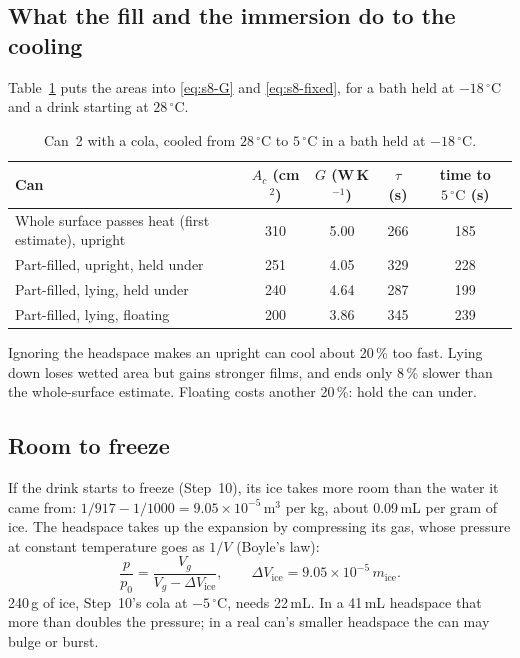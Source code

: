 \documentclass[11pt,a4paper]{article}
\newcommand{\dC}{\,{}^{\circ}\mathrm{C}}
\begin{document}
\subsection{What the fill and the immersion do to the cooling}
Table~\ref{tab:fill} puts the areas into \eqref{eq:s8-G} and \eqref{eq:s8-fixed}, for a bath held at
$-18\dC$ and a drink starting at $28\dC$.

\begin{table}[ht]
\centering\small
\caption{Can~2 with a cola, cooled from $28\dC$ to $5\dC$ in a bath held at $-18\dC$.}
\label{tab:fill}
\begin{tabular}{@{}lcccc@{}}
\toprule
Can & $A_c$ (cm$^2$) & $G$ (W\,K$^{-1}$) & $\tau$ (s) & time to $5\dC$ (s)\\
\midrule
Whole surface passes heat (first estimate), upright & 310 & 5.00 & 266 & 185\\
Part-filled, upright, held under & 251 & 4.05 & 329 & 228\\
Part-filled, lying, held under & 240 & 4.64 & 287 & 199\\
Part-filled, lying, floating & 200 & 3.86 & 345 & 239\\
\bottomrule
\end{tabular}
\end{table}

Ignoring the headspace makes an upright can cool about 20\,\% too fast. Lying down loses wetted area but
gains stronger films, and ends only 8\,\% slower than the whole-surface estimate. Floating costs another
20\,\%: hold the can under.

\subsection{Room to freeze}
If the drink starts to freeze (Step~10), its ice takes more room than the water it came from:
$1/917 - 1/1000 = 9.05\times10^{-5}$\,m$^3$ per kg, about 0.09\,mL per gram of ice. The headspace takes up the
expansion by compressing its gas, whose pressure at constant temperature goes as $1/V$ (Boyle's law):
\begin{equation}
\frac{p}{p_0} = \frac{V_g}{V_g - \Delta V_{\mathrm{ice}}}, \qquad \Delta V_{\mathrm{ice}} = 9.05\times10^{-5}\,m_{\mathrm{ice}} . \label{eq:s9-pressure}
\end{equation}
240\,g of ice, Step~10's cola at $-5\dC$, needs 22\,mL. In a 41\,mL headspace that more than doubles the
pressure; in a real can's smaller headspace the can may bulge or burst.
\end{document}
